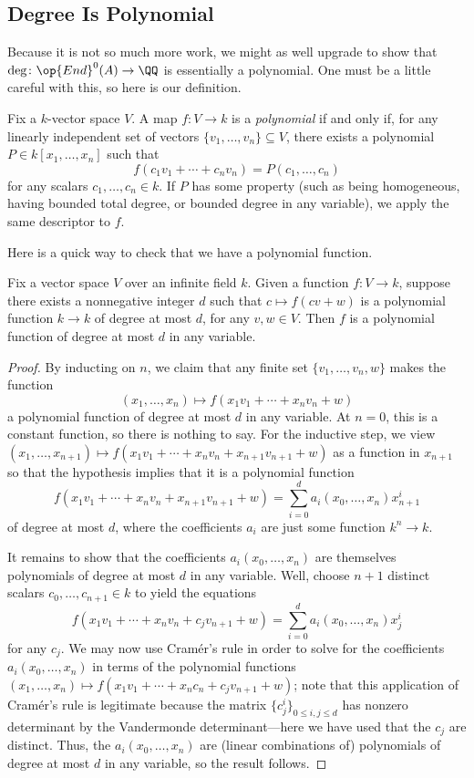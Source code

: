 \documentclass{amsart}
\begin{document}
\subsection{Degree Is Polynomial}
Because it is not so much more work, we might as well upgrade  to show that $\deg\colon\op{End}^0(A)\to\QQ$ is essentially a polynomial. One must be a little careful with this, so here is our definition.
\begin{definition}
	Fix a $k$-vector space $V$. A map $f\colon V\to k$ is a \textit{polynomial} if and only if, for any linearly independent set of vectors $\{v_1,\ldots,v_n\}\subseteq V$, there exists a polynomial $P\in k[x_1,\ldots,x_n]$ such that
	\[f(c_1v_1+\cdots+c_nv_n)=P(c_1,\ldots,c_n)\]
	for any scalars $c_1,\ldots,c_n\in k$. If $P$ has some property (such as being homogeneous, having bounded total degree, or bounded degree in any variable), we apply the same descriptor to $f$.
\end{definition}
Here is a quick way to check that we have a polynomial function.
\begin{lemma} \label{lem:get-poly-func}
	Fix a vector space $V$ over an infinite field $k$. Given a function $f\colon V\to k$, suppose there exists a nonnegative integer $d$ such that $c\mapsto f(cv+w)$ is a polynomial function $k\to k$ of degree at most $d$, for any $v,w\in V$. Then $f$ is a polynomial function of degree at most $d$ in any variable.
\end{lemma}
\begin{proof}
	By inducting on $n$, we claim that any finite set $\{v_1,\ldots,v_n,w\}$ makes the function
	\[(x_1,\ldots,x_n)\mapsto f(x_1v_1+\cdots+x_nv_n+w)\]
	a polynomial function of degree at most $d$ in any variable. At $n=0$, this is a constant function, so there is nothing to say. For the inductive step, we view $(x_1,\ldots,x_{n+1})\mapsto f(x_1v_1+\cdots+x_nv_n+x_{n+1}v_{n+1}+w)$ as a function in $x_{n+1}$ so that the hypothesis implies that it is a polynomial function
	\[f(x_1v_1+\cdots+x_nv_n+x_{n+1}v_{n+1}+w)=\sum_{i=0}^da_i(x_0,\ldots,x_n)x_{n+1}^i\]
	of degree at most $d$, where the coefficients $a_i$ are just some function $k^n\to k$.
	
	It remains to show that the coefficients $a_i(x_0,\ldots,x_n)$ are themselves polynomials of degree at most $d$ in any variable. Well, choose $n+1$ distinct scalars $c_0,\ldots,c_{n+1}\in k$ to yield the equations
	\[f(x_1v_1+\cdots+x_nv_n+c_jv_{n+1}+w)=\sum_{i=0}^da_i(x_0,\ldots,x_n)x_j^i\]
	for any $c_j$. We may now use Cram\'er's rule in order to solve for the coefficients $a_i(x_0,\ldots,x_n)$ in terms of the polynomial functions $(x_1,\ldots,x_n)\mapsto f(x_1v_1+\cdots+x_nc_n+c_jv_{n+1}+w)$; note that this application of Cram\'er's rule is legitimate because the matrix $\big\{c_j^i\big\}_{0\le i,j\le d}$ has nonzero determinant by the Vandermonde determinant---here we have used that the $c_j$ are distinct. Thus, the $a_i(x_0,\ldots,x_n)$ are (linear combinations of) polynomials of degree at most $d$ in any variable, so the result follows.
\end{proof}
\end{document}
